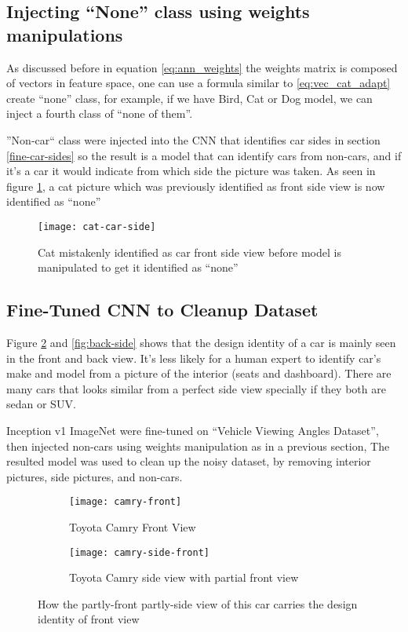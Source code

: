 \subsection{Injecting ``None'' class using weights manipulations}

As discussed before in equation \ref{eq:ann_weights} the weights matrix is composed of vectors in feature space,
one can use a formula similar to \ref{eq:vec_cat_adapt} create ``none'' class, 
for example, if we have Bird, Cat or Dog model, we can inject a fourth class of ``none of them''.

''Non-car`` class were injected into the CNN that identifies car sides in section \ref{fine-car-sides}
so the result is a model that can identify cars from non-cars,
and if it's a car it would indicate from which side the picture was taken.
As seen in figure \ref{fig:cat-car-side},
a cat picture which was previously identified as front side view is now identified as ``none''


\begin{figure}[!h]
\centering
\texttt{[image: cat-car-side]}
\caption{Cat mistakenly identified as car front side view before model is manipulated to get it identified as ``none''}\label{fig:cat-car-side}
\end{figure}

\subsection{Fine-Tuned CNN to Cleanup Dataset}

Figure \ref{fig:front-side} and \ref{fig:back-side} shows that the design identity of a car
is mainly seen in the front and back view.
It's less likely for a human expert to identify car's make and model from a picture of the interior (seats and dashboard).
There are many cars that looks similar from a perfect side view specially if they both are sedan or SUV.

Inception v1 ImageNet were fine-tuned on ``Vehicle Viewing Angles Dataset'', then 
injected non-cars using weights manipulation as in a previous section, 
The resulted model was used to clean up the noisy dataset,
by removing interior pictures, side pictures, and non-cars.

\begin{figure}[!htbp]
\centering
    \begin{subfigure}[t]{0.48\textwidth}
        \centering
        \texttt{[image: camry-front]}
        \caption{Toyota Camry Front View}
    \end{subfigure}
    \begin{subfigure}[t]{0.48\textwidth}
        \centering
        \texttt{[image: camry-side-front]}
        \caption{Toyota Camry side view with partial front view}
    \end{subfigure}
\caption{How the partly-front partly-side view of this car carries the design identity of front view}\label{fig:front-side}
\end{figure}

